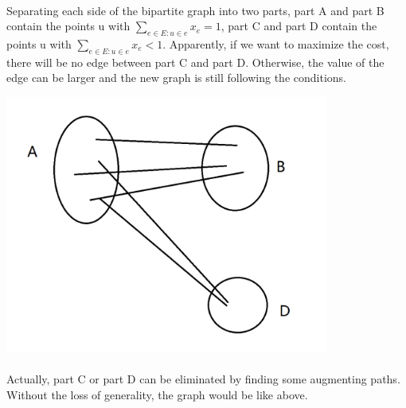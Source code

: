 \documentclass[12pt,a4]{article}
\begin{document}
\paragraph{}Separating each side of the bipartite graph into two parts, part A and part B contain the points u with $\sum_{e \in E: u \in e} x_e =1$, part C and part D  contain the points u with $\sum_{e \in E: u \in e} x_e <1$. Apparently, if we want to maximize the cost, there will be no edge between part C and part D. Otherwise, the value of the edge can be larger and the new graph is still following the conditions.
 \begin{center}
  \includegraphics[width=0.8\textwidth]{p2.png}
 \end{center}
\paragraph{}Actually, part C or part D can be eliminated by finding some augmenting paths. Without the loss of generality, the graph would be like above.
\end{document}
